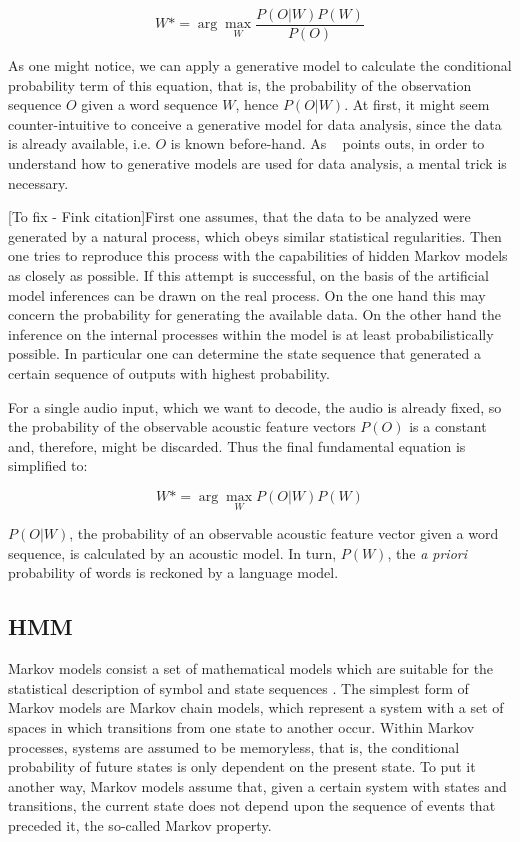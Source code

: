 \begin{equation}
W*= \arg\max_{W}\frac{P(O|W)P(W)}{P(O)}
\end{equation}

As one might notice, we can apply a generative model to calculate the conditional probability term of this
equation, that is, the probability of the observation sequence $O$ given a word sequence $W$, hence $P(O|W)$.
At first, it might seem counter-intuitive to conceive a generative model for data analysis, since the 
data is already available, i.e. $O$ is known before-hand. As \citet{Fink2008}~\citep{Fink2008} points 
outs, in order to understand how to generative models are used for data analysis, a mental trick is necessary.

[To fix - Fink citation]First one assumes, that the data
to be analyzed were generated by a natural process, which obeys similar statistical
regularities. Then one tries to reproduce this process with the capabilities of hidden
Markov models as closely as possible. If this attempt is successful, on the basis of
the artificial model inferences can be drawn on the real process. On the one hand
this may concern the probability for generating the available data. On the other hand
the inference on the internal processes within the model is at least probabilistically
possible. In particular one can determine the state sequence that generated a certain
sequence of outputs with highest probability.

For a single audio input, which we want to decode, the audio is already fixed, so the 
probability of the observable acoustic feature vectors $P(O)$ is a constant and, therefore, 
might be discarded. Thus the final fundamental equation is simplified to:

\begin{equation}
W*= \arg\max_{W}P(O|W)P(W)
\end{equation}

$P(O|W)$, the probability of an observable acoustic feature vector given a word sequence, is calculated by 
an acoustic model. In turn, $P(W)$, the \emph{a priori} probability of words is reckoned by a language model.

\subsection{HMM}

Markov models consist a set of mathematical models which are suitable for the statistical description of symbol
and state sequences \cite{Fink2008}. The simplest form of Markov models are Markov chain models, 
which represent a system with a set of spaces in which transitions from one state to another occur. 
Within Markov processes, systems are assumed to be memoryless, that is, the conditional probability
of future states is only dependent on the present state. To put it another way, Markov models assume that,
given a certain system with states and transitions, the current state does not depend upon the 
sequence of events that preceded it, the so-called Markov property. 

